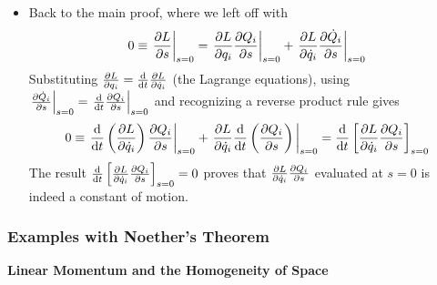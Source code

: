 \documentclass[11pt, a4paper]{article}
\begin{document}
\begin{itemize}
\begin{itemize}
		\item Back to the main proof, where we left off with 
		\begin{equation*}
			0 \equiv \eval{\pdv{L}{s}}_{s=0} = \eval{\pdv{L}{q_{i}} \pdv{Q_{i}}{s}}_{s=0} + \eval{\pdv{L}{\dot{q}_{i}} \pdv{\dot{Q}_{i}}{s}}_{s=0}
		\end{equation*}		
		Substituting $ \pdv{L}{q_{i}} = \dv{}{t}\pdv{L}{\dot{q}_{i}}$ (the Lagrange equations), using $ \eval{\pdv{\dot{Q}_{i}}{s}}_{s=0} = \eval{\dv{}{t}\pdv{Q_{i}}{s}}_{s=0} $ and recognizing a reverse product rule gives
		\begin{equation*}
			0 \equiv \eval{\dv{}{t}\left(\pdv{L}{\dot{q}_{i}}\right) \pdv{Q_{i}}{s}}_{s=0} + \eval{\pdv{L}{\dot{q}_{i}}  \dv{}{t}\left(\pdv{Q_{i}}{s}\right)}_{s=0} =\dv{}{t} \left[\pdv{L}{\dot{q}_{i}}\pdv{Q_{i}}{s} \right]_{s=0}
		\end{equation*}
		The result $ \dv{}{t} \left[\pdv{L}{\dot{q}_{i}}\pdv{Q_{i}}{s} \right]_{s=0} = 0 $ proves that $ \pdv{L}{\dot{q}_{i}}\pdv{Q_{i}}{s} $ evaluated at $ s=0 $ is indeed a constant of motion.
	\end{itemize}

\end{itemize}

\subsubsection{Examples with Noether's Theorem}

\textbf{Linear Momentum and the Homogeneity of Space}
\end{document}
